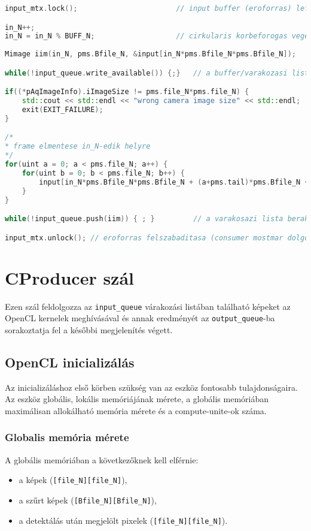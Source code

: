 \begin{lstlisting}[language=C++]
input_mtx.lock();						// input buffer (eroforras) lefoglalasa

in_N++;
in_N = in_N % BUFF_N;					// cirkularis korbeforogas vegett
 
Mimage iim(in_N, pms.Bfile_N, &input[in_N*pms.Bfile_N*pms.Bfile_N]);

while(!input_queue.write_available()) {;}	// a buffer/varakozasi lista kiurulesere varas

if((*pAqImageInfo).iImageSize != pms.file_N*pms.file_N) {
	std::cout << std::endl << "wrong camera image size" << std::endl;
	exit(EXIT_FAILURE);
}

/*
* frame elmentese in_N-edik helyre
*/
for(uint a = 0; a < pms.file_N; a++) {
	for(uint b = 0; b < pms.file_N; b++) {
		input[in_N*pms.Bfile_N*pms.Bfile_N + (a+pms.tail)*pms.Bfile_N + (b+pms.tail)] = (*pAqImageInfo).pImageBuffer[a*pms.file_N + b];
	}
}

while(!input_queue.push(iim)) { ; }			// a varakosazi lista berakas

input_mtx.unlock(); // eroforras felszabaditasa (consumer mostmar dolgozhat rajta)
\end{lstlisting}
	
\section{CProducer szál}
Ezen szál feldolgozza az \texttt{input\_queue} várakozási listában található képeket az OpenCL kernelek meghívásával és annak
eredményét az \texttt{output\_queue}-ba sorakoztatja fel a későbbi megjelenítés végett.
	
	\subsection{OpenCL inicializálás}
	Az inicializáláshoz első körben szükség van az eszköz fontosabb tulajdonságaira. Az eszköz globális, lokális memóriájának mérete,
	a globális memóriában maximálisan allokálható memória mérete és a compute-unite-ok száma.
	\subsubsection{Globalis memória mérete}
	A globális memóriában a következőknek kell elférnie:
	\begin{itemize}[noitemsep]
	  \item a képek (\texttt{[file\_N][file\_N]}),
	  \item a szűrt képek (\texttt{[Bfile\_N][Bfile\_N]}),
	  \item a detektálás után megjelölt pixelek (\texttt{[file\_N][file\_N]}).
	\end{itemize}
	

